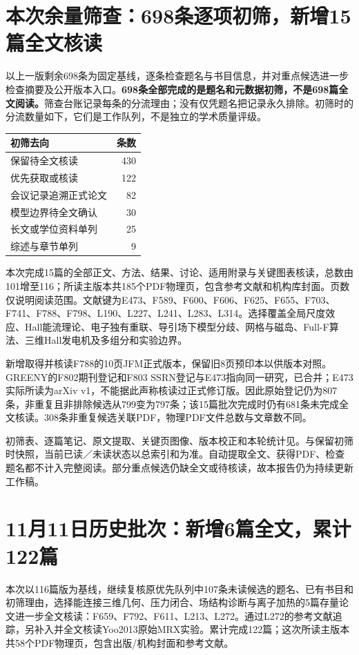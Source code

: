 \documentclass[UTF8,a4paper,11pt,openany,fontset=fandol]{ctexbook}
\begin{document}
\section{本次余量筛查：698条逐项初筛，新增15篇全文核读}
以上一版剩余698条为固定基线，逐条检查题名与书目信息，并对重点候选进一步检查摘要及公开版本入口。\textbf{698条全部完成的是题名和元数据初筛，不是698篇全文阅读。}筛查台账记录每条的分流理由；没有仅凭题名把记录永久排除。初筛时的分流数量如下，它们是工作队列，不是独立的学术质量评级。
\begin{center}\small
\begin{tabular}{lr}\toprule 初筛去向 & 条数\\\midrule
保留待全文核读 &430\\
优先获取或核读 &122\\
会议记录追溯正式论文 &82\\
模型边界待全文确认 &30\\
长文或学位资料单列 &25\\
综述与章节单列 &9\\\bottomrule
\end{tabular}
\end{center}
本次完成15篇的全部正文、方法、结果、讨论、适用附录与关键图表核读，总数由101增至116；所读主版本共185个PDF物理页，包含参考文献和机构库封面。页数仅说明阅读范围。文献键为E473、F589、F600、F606、F625、F655、F703、F741、F788、F798、L190、L227、L241、L283、L314。选择覆盖全局尺度效应、Hall能流理论、电子独有重联、导引场下模型分歧、网格与磁岛、Full-F算法、三维Hall发电机及多组分和实验边界。

新增取得并核读F788的10页JFM正式版本，保留旧8页预印本以供版本对照。GREENY的F802期刊登记和F803 SSRN登记与E473指向同一研究，已合并；E473实际所读为arXiv v1，不能据此声称核读过正式修订版。因此原始登记仍为807条，非重复且非排除候选从799变为797条；该15篇批次完成时仍有681条未完成全文核读。308条非重复候选关联PDF，物理PDF文件总数与文章数不同。

初筛表、逐篇笔记、原文提取、关键页图像、版本校正和本轮统计见。与保留初筛时快照，当前已读／未读状态以总索引和为准。自动提取全文、获得PDF、检查题名都不计入完整阅读。部分重点候选仍缺全文或待核读，故本报告仍为持续更新工作稿。

\section{11月11日历史批次：新增6篇全文，累计122篇}
本次以116篇版为基线，继续复核原优先队列中107条未读候选的题名、已有书目和初筛理由，选择能连接三维几何、压力闭合、场结构诊断与离子加热的5篇存量论文进一步全文核读：F659、F792、F611、L213、L272。通过L272的参考文献追踪，另补入并全文核读Yoo2013原始MRX实验。累计完成122篇；这次所读主版本共58个PDF物理页，包含出版/机构封面和参考文献。
\end{document}
